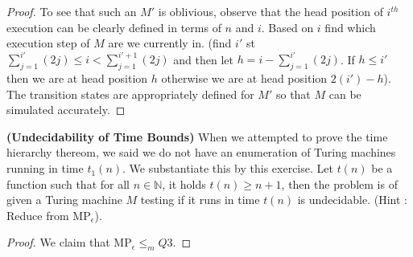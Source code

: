 \documentclass[solution,addpoints,12pt]{exam}
\newcommand{\many}{\ensuremath{\le_m}\xspace}
\renewcommand{\MP}{\ensuremath{\mathrm{MP}}\xspace}
\begin{document}
\begin{questions}
\begin{solution}
\begin{proof}
		To see that such an $M'$ is oblivious, observe that the head position of $i^{th}$ execution can be clearly defined in terms of $n$ and $i$. Based on $i$ find which execution step of $M$ are we currently in. (find $i'$ st $\sum_{j=1}^{i'}(2j) \leq i < \sum_{j=1}^{i'+1}(2j)$ and then let $h = i - \sum_{j=1}^{i'}(2j)$. If $h \leq i'$ then we are at head position $h$ otherwise we are at head position $2(i') - h$). 
		The transition states are appropriately defined for $M'$ so that $M$ can be simulated accurately.    
	\end{proof}
\end{solution}
\question[7]\textbf{(Undecidability of Time Bounds)}
When we attempted to prove the time hierarchy thereom, we said we do not have an enumeration of Turing machines running in time $t_1(n)$. We substantiate this by this exercise. Let $t(n)$ be a function such that for all $n \in \mathbb{N}$, it holds $t(n) \ge n+1$, then the problem is of given a Turing machine $M$ testing if it runs in time $t(n)$ is undecidable. (Hint : Reduce from $\MP_\epsilon$).
\begin{solution}
	\begin{proof}
			 We claim that $\MP_\epsilon \many Q3$.
			 

\end{proof}
\end{solution}
\end{questions}
\end{document}
